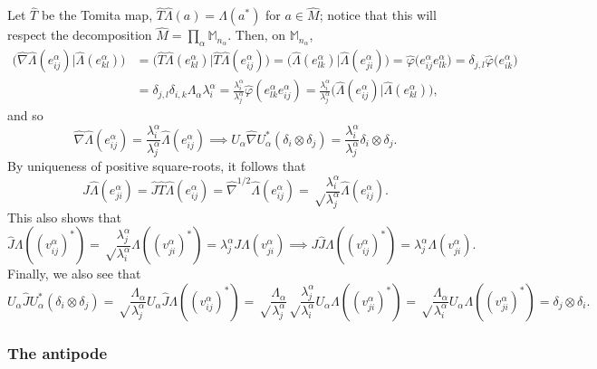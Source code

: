\documentclass[twoside,a4paper,12pt]{article}
\theoremstyle{plain}
\theoremstyle{definition}
\begin{document}
Let $\hat T$ be the Tomita map, $\hat T\hat\Lambda(a) = \hat\Lambda(a^*)$
for $a\in\hat M$; notice that this will respect the decomposition $\hat M
= \prod_\alpha \mathbb M_{n_\alpha}$.  Then, on $\mathbb M_{n_\alpha}$,
\begin{align*}
\big( \hat\nabla \hat\Lambda(e^\alpha_{ij}) \big|
   \hat\Lambda(e^\alpha_{kl}) \big)
&= \big( \hat T\hat\Lambda(e^\alpha_{kl}) \big|
   \hat T  \hat\Lambda(e^\alpha_{ij}) \big)
= \big( \hat\Lambda(e^\alpha_{lk}) \big|
   \hat\Lambda(e^\alpha_{ji}) \big)
= \hat\varphi\big( e^\alpha_{ij} e^\alpha_{lk} \big)
= \delta_{j,l} \hat\varphi\big( e^\alpha_{ik} \big) \\
&= \delta_{j,l} \delta_{i,k} \Lambda_\alpha \lambda^\alpha_i
= \frac{\lambda^\alpha_i}{\lambda^\alpha_j}
\hat\varphi(e^\alpha_{lk} e^\alpha_{ij})
= \frac{\lambda^\alpha_i}{\lambda^\alpha_j}
\big( \hat\Lambda(e^\alpha_{ij}) \big|
   \hat\Lambda(e^\alpha_{kl}) \big),
\end{align*}
and so
\[ \hat\nabla \hat\Lambda(e^\alpha_{ij})
= \frac{\lambda^\alpha_i}{\lambda^\alpha_j} \hat\Lambda(e^\alpha_{ij})
\implies U_\alpha \hat\nabla U_\alpha^*(\delta_i\otimes\delta_j)
= \frac{\lambda^\alpha_i}{\lambda^\alpha_j}
\delta_i\otimes\delta_j. \]
By uniqueness of positive square-roots, it follows that
\[\hat J \hat\Lambda(e^\alpha_{ji})
= \hat J\hat T \hat\Lambda(e^\alpha_{ij})
= \hat\nabla^{1/2} \hat\Lambda(e^\alpha_{ij})
= \sqrt\frac{\lambda^\alpha_i}{\lambda^\alpha_j} \hat\Lambda(e^\alpha_{ij}). \]
This also shows that
\[ \hat J \Lambda((v^\alpha_{ij})^*)
= \sqrt\frac{\lambda^\alpha_j}{\lambda^\alpha_i}
\Lambda((v^\alpha_{ji})^*)
= \lambda^\alpha_j J\Lambda(v^\alpha_{ji})
\implies J \hat J \Lambda((v^\alpha_{ij})^*)
= \lambda^\alpha_j \Lambda(v^\alpha_{ji}). \]
Finally, we also see that
\[ U_\alpha \hat J U_\alpha^*(\delta_i\otimes\delta_j)
= \sqrt\frac{\Lambda_\alpha}{\lambda^\alpha_j} U_\alpha \hat J
   \Lambda((v^\alpha_{ij})^*)
= \sqrt\frac{\Lambda_\alpha}{\lambda^\alpha_j}
  \sqrt\frac{\lambda^\alpha_j}{\lambda^\alpha_i}
  U_\alpha \Lambda((v^\alpha_{ji})^*)
= \sqrt\frac{\Lambda_\alpha}{\lambda^\alpha_i}
  U_\alpha \Lambda((v^\alpha_{ji})^*)
= \delta_j \otimes \delta_i. \]



\subsubsection{The antipode}
\end{document}
